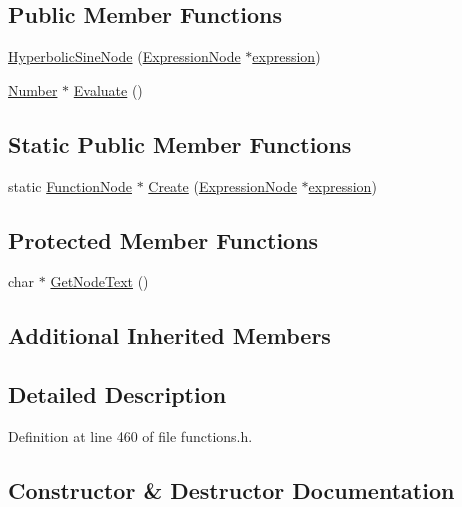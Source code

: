 \subsection*{Public Member Functions}
\begin{DoxyCompactItemize}
\item 
\hyperlink{classHyperbolicSineNode_a3ebf3cd088c7f0d2d4a1a2f4ec7ac0b0}{Hyperbolic\+Sine\+Node} (\hyperlink{classExpressionNode}{Expression\+Node} $\ast$\hyperlink{classFunctionNode_ad7577b179a1937aaf8a0058bb5b546dc}{expression})
\item 
\hyperlink{structNumber}{Number} $\ast$ \hyperlink{classHyperbolicSineNode_a8f11c6b2d8d793856f17e3a249f20b69}{Evaluate} ()
\end{DoxyCompactItemize}
\subsection*{Static Public Member Functions}
\begin{DoxyCompactItemize}
\item 
static \hyperlink{classFunctionNode}{Function\+Node} $\ast$ \hyperlink{classHyperbolicSineNode_a32bfb217a9351f882d1a68a76f4d2b94}{Create} (\hyperlink{classExpressionNode}{Expression\+Node} $\ast$\hyperlink{classFunctionNode_ad7577b179a1937aaf8a0058bb5b546dc}{expression})
\end{DoxyCompactItemize}
\subsection*{Protected Member Functions}
\begin{DoxyCompactItemize}
\item 
char $\ast$ \hyperlink{classHyperbolicSineNode_a953eb8445e274935e1e7f646ca444fd8}{Get\+Node\+Text} ()
\end{DoxyCompactItemize}
\subsection*{Additional Inherited Members}


\subsection{Detailed Description}


Definition at line 460 of file functions.\+h.



\subsection{Constructor \& Destructor Documentation}
